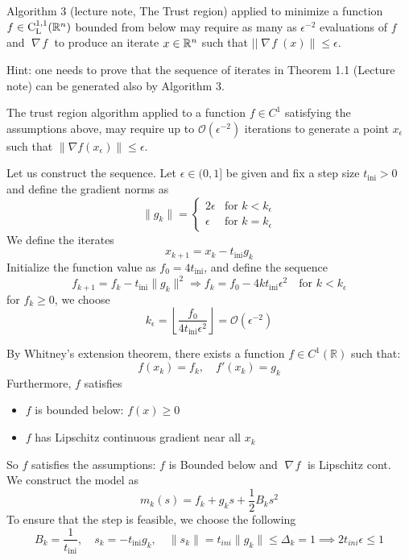 \documentclass{ExerciseSheet}
\newif\ifsolutions
\newcommand{\LC}{\mathord{\mathrm{C^{1,1}_{L}}}}
\DeclareMathOperator*{\grad}{\mathit{\nabla \!f}}
\begin{document}
\begin{problem} Algorithm 3 (lecture note, The Trust region) applied to minimize a function $f\in \LC(\Rn)$ bounded from below may require as many as $\epsilon^{-2}$ evaluations of $f$ and $\grad$ to produce an iterate $x\in \mathbb{R}^n$ such that $||\grad (x)\|\leq \epsilon.$

Hint: one needs to prove that the sequence of iterates in Theorem 1.1 (Lecture note) can be generated also
by Algorithm 3. 
\end{problem}

\ifsolutions
\vskip 0.3cm
\begin{solution}

The trust region algorithm applied to a function $ f \in C^1 $ satisfying the assumptions above, may require up to $\mathcal{O}(\epsilon^{-2}) $ iterations to generate a point $ x_\epsilon $ such that $ \|\nabla f(x_\epsilon)\| \leq \epsilon$.\\
\vskip 0.2cm

Let us construct the sequence. Let $ \epsilon \in (0, 1] $ be given and fix a step size $ t_{\text{ini}} > 0 $ and define the gradient norms as
\[
\|g_k\| = \begin{cases}
2\epsilon & \text{for } k < k_\epsilon \\
\epsilon & \text{for } k = k_\epsilon
\end{cases}
\]
We define the iterates
\[ x_{k+1} = x_k - t_{\text{ini}} g_k\]
Initialize the function value as $f_0 = 4t_{\text{ini}} $, and define the sequence
\[
f_{k+1} = f_k - t_{\text{ini}} \|g_k\|^2
\Rightarrow f_k = f_0 - 4k t_{\text{ini}} \epsilon^2 \quad \text{for } k < k_\epsilon
\]
for $f_k \geq 0$, we choose
\[
k_\epsilon = \left\lfloor \frac{f_0}{4 t_{\text{ini}} \epsilon^2} \right\rfloor = \mathcal{O}(\epsilon^{-2})
\]

By Whitney’s extension theorem, there exists a function $ f \in C^1(\mathbb{R}) $ such that:
\[f(x_k) = f_k, \quad f'(x_k) = g_k\]
Furthermore, $ f $ satisfies
\begin{itemize}
    \item $f $ is bounded below: $ f(x) \geq 0 $
    \item $ f $ has Lipschitz continuous gradient near all $ x_k $
\end{itemize}
So $ f $ satisfies the assumptions: $f$ is Bounded below and $\grad $ is Lipschitz cont. \\
\vskip 0.2cm
We construct the model as
\[
m_k(s) = f_k + g_k s + \frac{1}{2} B_k s^2
\]
To ensure that the step is feasible, we choose the following
\[
B_k = \frac{1}{t_{\text{ini}}}, \quad s_k = -t_{\text{ini}} g_k, \quad \|s_k\| = t_{ini}\|g_k\| \leq \Delta_k = 1 \implies 2t_{ini}\epsilon \leq 1
\]  \\


\end{solution}
\end{document}
